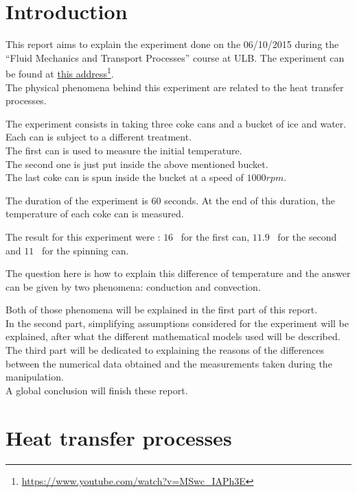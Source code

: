 \documentclass{report}
\begin{document}
	\chapter{Introduction}\label{intro}
	
	This report aims to explain the experiment done on the 06/10/2015 during the ``Fluid Mechanics and Transport Processes'' course at ULB. The experiment can be found at \hyperref{https://www.youtube.com/watch?v=MSwc_IAPh3E}{}{}{this address}\footnote{\url{https://www.youtube.com/watch?v=MSwc_IAPh3E}}.\\
	The physical phenomena behind this experiment are related to the heat transfer processes.

	The experiment consists in taking three coke cans and a bucket of ice and water. Each can is subject to a different treatment.\\
	The first can is used to measure the initial temperature.\\
	The second one is just put inside the above mentioned bucket.\\
	The last coke can is spun inside the bucket at a speed of $1000rpm$.
	
	The duration of the experiment is $60$ seconds.	At the end of this duration, the temperature of each coke can is measured. 
	
	The result for this experiment were : $16$ \textcelsius\ for the first can, $11.9$ \textcelsius\ for the second and $11$ \textcelsius\ for the spinning can.
	
	The question here is how to explain this difference of temperature and the answer can be given by two phenomena: conduction and convection.

	Both of those phenomena will be explained in the first part of this report.\\
	In the second part, simplifying assumptions considered for the experiment will be explained, after what the different mathematical models used will be described.\\
	The third part will be dedicated to explaining the reasons of the differences between the numerical data obtained and the measurements taken during the manipulation.\\
	A global conclusion will finish these report.
	
	\chapter{Heat transfer processes}\label{htp}
	
\end{document}
